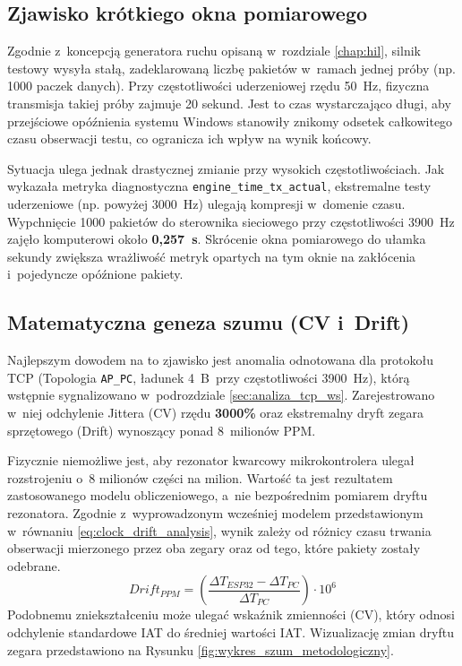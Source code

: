 \subsection{Zjawisko krótkiego okna pomiarowego}

Zgodnie z~koncepcją generatora ruchu opisaną w~rozdziale \ref{chap:hil}, silnik testowy wysyła stałą, zadeklarowaną liczbę pakietów w~ramach jednej próby (np. 1000 paczek danych).
Przy częstotliwości uderzeniowej rzędu 50~Hz, fizyczna transmisja takiej próby zajmuje 20 sekund.
Jest to czas wystarczająco długi, aby przejściowe opóźnienia systemu Windows stanowiły znikomy odsetek całkowitego czasu obserwacji testu, co ogranicza ich wpływ na wynik końcowy.

Sytuacja ulega jednak drastycznej zmianie przy wysokich częstotliwościach.
Jak wykazała metryka diagnostyczna \texttt{engine\_time\_tx\_actual}, ekstremalne testy uderzeniowe (np. powyżej 3000~Hz) ulegają kompresji w~domenie czasu.
Wypchnięcie 1000 pakietów do sterownika sieciowego przy częstotliwości 3900~Hz zajęło komputerowi około \textbf{0,257~s}.
Skrócenie okna pomiarowego do ułamka sekundy zwiększa wrażliwość metryk opartych na tym oknie na zakłócenia i~pojedyncze opóźnione pakiety.

\subsection{Matematyczna geneza szumu (CV i~Drift)}

Najlepszym dowodem na to zjawisko jest anomalia odnotowana dla protokołu TCP (Topologia \texttt{AP\_PC}, ładunek 4~B~przy częstotliwości 3900~Hz), którą wstępnie sygnalizowano w~podrozdziale \ref{sec:analiza_tcp_ws}.
Zarejestrowano w~niej odchylenie Jittera (CV) rzędu \textbf{3000\%} oraz ekstremalny dryft zegara sprzętowego (Drift) wynoszący ponad 8~milionów PPM.

Fizycznie niemożliwe jest, aby rezonator kwarcowy mikrokontrolera ulegał rozstrojeniu o~8 milionów części na milion.
Wartość ta jest rezultatem zastosowanego modelu obliczeniowego, a~nie bezpośrednim pomiarem dryftu rezonatora.
Zgodnie z~wyprowadzonym wcześniej modelem przedstawionym w~równaniu \ref{eq:clock_drift_analysis}, wynik zależy od różnicy czasu trwania obserwacji mierzonego przez oba zegary oraz od tego, które pakiety zostały odebrane.
\begin{equation}
      Drift_{PPM} = \left( \frac{\Delta T_{ESP32} - \Delta T_{PC}}{\Delta T_{PC}} \right) \cdot 10^6 \label{eq:clock_drift_analysis} \end{equation} Podobnemu zniekształceniu może ulegać wskaźnik zmienności (CV), który odnosi odchylenie standardowe IAT do średniej wartości IAT.
Wizualizację zmian dryftu zegara przedstawiono na Rysunku \ref{fig:wykres_szum_metodologiczny}.

